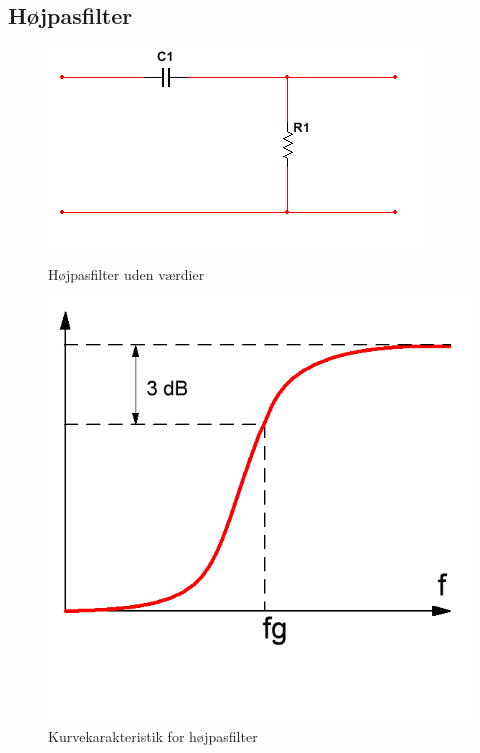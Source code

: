 \subsection{Højpasfilter}

\begin{figure}[htb]
  \begin{minipage}{0.45\textwidth}
    \centering
      \includegraphics[width=\textwidth]{billeder/HWdesign/HP_UV}
      \caption{Højpasfilter uden værdier}
    \label{fig:HP_UV}
  \end{minipage}
  \hspace{0.1\textwidth}
  \begin{minipage}{0.45\textwidth}
    \centering
      \includegraphics[width=\textwidth]{billeder/HWdesign/HP_KURVE}
      \caption{Kurvekarakteristik for højpasfilter}
    \label{fig:HP_KURVE}
  \end{minipage}
\end{figure}

